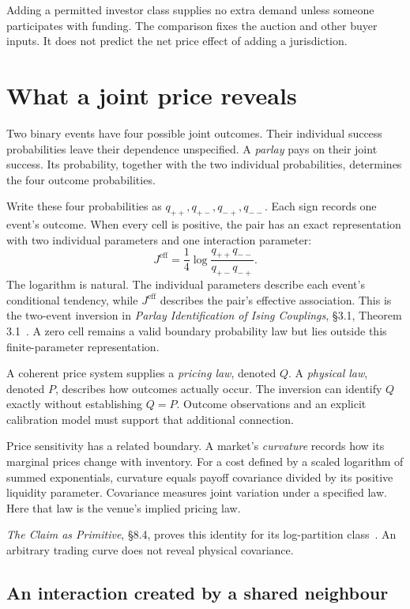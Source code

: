 \documentclass{momentum}
\begin{document}
Adding a permitted investor class supplies no extra demand unless someone participates with funding. The comparison fixes the auction and other buyer inputs. It does not predict the net price effect of adding a jurisdiction.

\section{What a joint price reveals}

Two binary events have four possible joint outcomes. Their individual success probabilities leave their dependence unspecified. A \emph{parlay} pays on their joint success. Its probability, together with the two individual probabilities, determines the four outcome probabilities.

Write these four probabilities as $q_{++},q_{+-},q_{-+},q_{--}$. Each sign records one event's outcome. When every cell is positive, the pair has an exact representation with two individual parameters and one interaction parameter:
\[
J^{\mathrm{eff}}=\frac14\log
\frac{q_{++}q_{--}}{q_{+-}q_{-+}}.
\]
The logarithm is natural. The individual parameters describe each event's conditional tendency, while $J^{\mathrm{eff}}$ describes the pair's effective association. This is the two-event inversion in \emph{Parlay Identification of Ising Couplings}, \S3.1, Theorem 3.1~\cite{parlay}. A zero cell remains a valid boundary probability law but lies outside this finite-parameter representation.

A coherent price system supplies a \emph{pricing law}, denoted $Q$. A \emph{physical law}, denoted $P$, describes how outcomes actually occur. The inversion can identify $Q$ exactly without establishing $Q=P$. Outcome observations and an explicit calibration model must support that additional connection.

Price sensitivity has a related boundary. A market's \emph{curvature} records how its marginal prices change with inventory. For a cost defined by a scaled logarithm of summed exponentials, curvature equals payoff covariance divided by its positive liquidity parameter. Covariance measures joint variation under a specified law. Here that law is the venue's implied pricing law.

\emph{The Claim as Primitive}, \S8.4, proves this identity for its log-partition class~\cite{claim}. An arbitrary trading curve does not reveal physical covariance.

\subsection{An interaction created by a shared neighbour}
\end{document}
